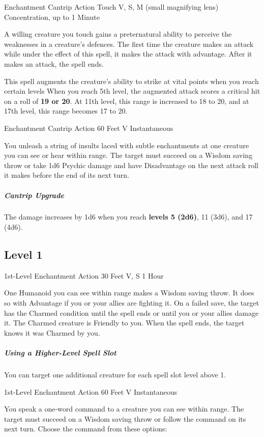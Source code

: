 \documentclass[letterpaper,openany,oneside,twocolumn]{book}
\begin{document}
	{Enchantment Cantrip}
	{Action}
	{Touch}
	{V, S, M (small magnifying lens)}
	{Concentration, up to 1 Minute}

A willing creature you touch gains a preternatural ability to perceive the weaknesses in a creature's defences. The first time the creature makes an attack while under the effect of this spell, it makes the attack with advantage. After it makes an attack, the spell ends.

This spell augments the creature's ability to strike at vital points when you reach certain levels When you reach 5th level, the augmented attack scores a critical hit on a roll of \textbf{19 or 20}. At 11th level, this range is increased to 18 to 20, and at 17th level, this range becomes 17 to 20.

	{Enchantment Cantrip}
	{Action}
	{60 Feet}
	{V}
	{Instantaneous}

You unleash a string of insults laced with subtle enchantments at one creature you can see or hear within range. The target must succeed on a Wisdom saving throw or take 1d6 Psychic damage and have Disadvantage on the next attack roll it makes before the end of its next turn.

\subparagraph*{Cantrip Upgrade} The damage increases by 1d6 when you reach \textbf{levels 5 (2d6)}, 11 (3d6), and 17 (4d6).

\subsection*{Level 1}

	{1st-Level Enchantment}
	{Action}
	{30 Feet}
	{V, S}
	{1 Hour}

One Humanoid you can see within range makes a Wisdom saving throw. It does so with Advantage if you or your allies are fighting it. On a failed save, the target has the Charmed condition until the spell ends or until you or your allies damage it. The Charmed creature is Friendly to you. When the spell ends, the target knows it was Charmed by you.

\subparagraph*{Using a Higher-Level Spell Slot} You can target one additional creature for each spell slot level above 1.

	{1st-Level Enchantment}
	{Action}
	{60 Feet}
	{V}
	{Instantaneous}

You speak a one-word command to a creature you can see within range. The target must succeed on a Wisdom saving throw or follow the command on its next turn. Choose the command from these options:
\end{document}
